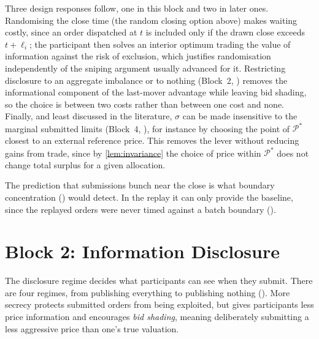 Three design responses follow, one in this block and two in later ones.
Randomising the close time (the random closing option above) makes waiting
costly, since an order dispatched at $t$ is included only if the drawn
close exceeds $t + \ell_i$; the participant then solves an interior
optimum trading the value of information against the risk of exclusion,
which justifies randomisation independently of the sniping argument
usually advanced for it. Restricting disclosure to an aggregate imbalance
or to nothing (Block~2, ) removes the informational
component of the last-mover advantage while leaving bid shading, so the
choice is between two costs rather than between one cost and none.
Finally, and least discussed in the literature, $\sigma$ can be made
insensitive to the marginal submitted limits (Block~4,
), for instance by choosing the point of
$\mathcal{P}^{*}$ closest to an external reference price. This removes the
lever without reducing gains from trade, since by \eqref{lem:invariance}
the choice of price within $\mathcal{P}^{*}$ does not change total surplus
for a given allocation.

The prediction that submissions bunch near the close is what boundary
concentration () would detect. In the replay it can
only provide the baseline, since the replayed orders were never timed
against a batch boundary ().

\section{Block 2: Information Disclosure}
\label{sec:disclosure}

The disclosure regime decides what participants can see when they submit.
There are four regimes, from publishing everything to publishing nothing
(). More secrecy protects submitted orders from being
exploited, but gives participants less price information and encourages
\emph{bid shading}, meaning deliberately submitting a less aggressive price
than one's true valuation.

